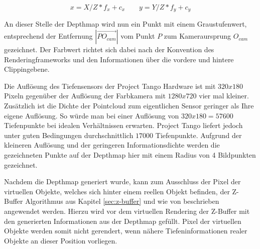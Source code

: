 \begin{equation}\label{eq:projection}
x = X / Z * f_x + c_x
\qquad
y = Y / Z * f_y + c_y
\end{equation}

An dieser Stelle der Depthmap wird nun ein Punkt mit einem Graustufenwert, entsprechend der Entfernung \(|\overrightarrow{PO_{cam}}|\) vom Punkt \(P\) zum Kameraursprung \(O_{cam}\) gezeichnet. Der Farbwert richtet sich dabei nach der Konvention des Renderingframeworks und den Informationen über die vordere und hintere Clippingebene.

Die Auflösung des Tiefensensors der Project Tango Hardware ist mit \(320x180\) Pixeln gegenüber der Auflösung der Farbkamera mit \(1280x720\) vier mal kleiner. Zusätzlich ist die Dichte der Pointcloud zum eigentlichen Sensor geringer als Ihre eigene Auflösung. So würde man bei einer Auflösung von \(320x180 = 57600\) Tiefenpunkte bei idealen Verhältnissen erwarten. Project Tango liefert jedoch unter guten Bedingungen durchschnittlich \(17000\) Tiefenpunkte. Aufgrund der kleineren Auflösung und der geringeren Informationsdichte werden die gezeichneten Punkte auf der Depthmap hier mit einem Radius von 4 Bildpunkten gezeichnet. 

Nachdem die Depthmap generiert wurde, kann zum Ausschluss der Pixel der virtuellen Objekte, welches sich hinter einem reellen Objekt befinden, der Z-Buffer Algorithmus aus Kapitel \ref{sec:z-buffer} und wie von \citet{wloka1995resolving} beschrieben angewendet werden. Hierzu wird vor dem virtuellen Rendering der Z-Buffer mit den generierten Informationen aus der Depthmap gefüllt. Pixel der virtuellen Objekte werden somit nicht gerendert, wenn nähere Tiefeninformationen realer Objekte an dieser Position vorliegen. 


